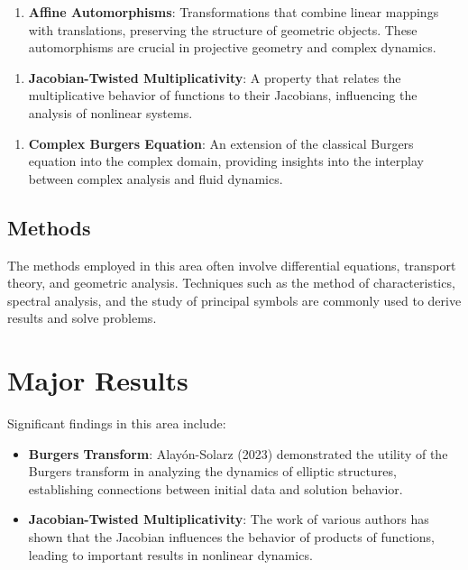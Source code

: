 \documentclass[11pt,a4paper]{article}
\begin{document}
\begin{enumerate}
\item \textbf{Affine Automorphisms}: Transformations that combine linear mappings with translations, preserving the structure of geometric objects. These automorphisms are crucial in projective geometry and complex dynamics.
\end{enumerate}

\begin{enumerate}
\item \textbf{Jacobian-Twisted Multiplicativity}: A property that relates the multiplicative behavior of functions to their Jacobians, influencing the analysis of nonlinear systems.
\end{enumerate}

\begin{enumerate}
\item \textbf{Complex Burgers Equation}: An extension of the classical Burgers equation into the complex domain, providing insights into the interplay between complex analysis and fluid dynamics.
\end{enumerate}

\subsection{Methods}

The methods employed in this area often involve differential equations, transport theory, and geometric analysis. Techniques such as the method of characteristics, spectral analysis, and the study of principal symbols are commonly used to derive results and solve problems.

\section{Major Results}

Significant findings in this area include:

\begin{itemize}
\item \textbf{Burgers Transform}: Alayón-Solarz (2023) demonstrated the utility of the Burgers transform in analyzing the dynamics of elliptic structures, establishing connections between initial data and solution behavior.
\end{itemize}

\begin{itemize}
\item \textbf{Jacobian-Twisted Multiplicativity}: The work of various authors has shown that the Jacobian influences the behavior of products of functions, leading to important results in nonlinear dynamics.
\end{itemize}
\end{document}

